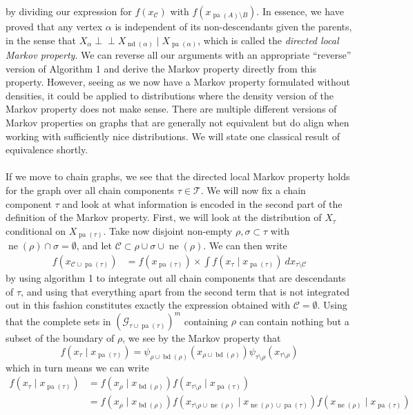 \documentclass[11pt, a4paper]{memoir}
\theoremstyle{break}
\theoremstyle{break}
\theoremstyle{nonumberplain}
\newcommand{\indep}{\perp \!\!\! \perp}
\DeclareMathOperator{\pa}{pa}
\DeclareMathOperator{\nei}{ne}
\DeclareMathOperator{\bd}{bd}
\DeclareMathOperator{\nd}{nd}
\begin{document}
by dividing our expression for $f(x_\mathcal{C})$ with $f(x_{\pa(A)\setminus B})$. In essence, we have proved that any vertex $\alpha$ is independent of its non-descendants given the parents, in the sense that $X_\alpha\indep X_{\nd(\alpha)}\mid X_{\pa(\alpha)}$, which is called the \textit{directed local Markov property}. We can reverse all our arguments with an appropriate \enquote{reverse} version of Algorithm 1 and derive the Markov property directly from this property. However, seeing as we now have a Markov property formulated without densities, it could be applied to distributions where the density version of the Markov property does not make sense. There are multiple different versions of Markov properties on graphs that are generally not equivalent but do align when working with sufficiently nice distributions. We will state one classical result of equivalence shortly.\\\\
If we move to chain graphs, we see that the directed local Markov property holds for the graph over all chain components $\tau\in \mathscr{T}$. We will now fix a chain component $\tau$ and look at what information is encoded in the second part of the definition of the Markov property. First, we will look at the distribution of $X_\tau$ conditional on $X_{\pa(\tau)}$. Take now disjoint non-empty $\rho,\sigma\subset \tau$ with $\nei(\rho)\cap \sigma=\emptyset$, and let $\mathcal{C}\subset \rho\cup\sigma\cup \nei(\rho)$. We can then write
\begin{align*}
f\left(x_{\mathcal{C}\cup\pa(\tau)}\right)&=f(x_{\pa(\tau)})\times \int f\left(x_\tau\mid x_{\pa(\tau)}\right)\ dx_{\tau\setminus \mathcal{C}}
\end{align*}
by using algorithm 1 to integrate out all chain components that are descendants of $\tau$, and using that everything apart from the second term that is not integrated out in this fashion constitutes exactly the expression obtained with $\mathcal{C}=\emptyset$. Using that the complete sets in $(\mathcal{G}_{\tau\cup\pa(\tau)})^{m}$ containing $\rho$ can contain nothing but a subset of  the boundary of $\rho$, we see by the Markov property that 
\begin{equation}\label{fact}
f\left(x_\tau\mid x_{\pa(\tau)}\right)=\psi_{\rho\cup\bd(\rho)}(x_{\rho\cup\bd(\rho)})\psi_{\tau\setminus \rho}(x_{\tau\setminus \rho})
\end{equation}
which in turn means we can write
\begin{align*}
f\left(x_\tau\mid x_{\pa(\tau)}\right)&=f\left(x_\rho\mid x_{\bd(\rho)}\right)f\left(x_{\tau\setminus\rho}\mid x_{\pa(\tau)}\right)\\
&=f\left(x_\rho\mid x_{\bd(\rho)}\right)f\left(x_{\tau\setminus\rho\cup\nei(\rho)}\mid x_{\nei(\rho)\cup\pa(\tau)}\right)f\left(x_{\nei(\rho)}\mid x_{\pa(\tau)}\right)
\end{align*}
\end{document}
